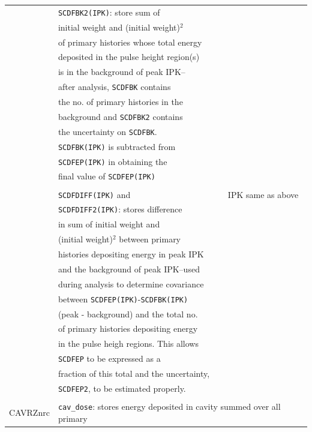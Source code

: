 \documentclass[12pt,twoside]{article}  %
\begin{document}
\begin{longtable}{lll}
          & {\tt SCDFBK2(IPK)}: store sum of&\\
          & initial weight and (initial weight)$^2$ &\\
          & of primary histories whose total energy&\\
          & deposited in the pulse height region(s)&\\
          & is in the background of peak IPK--&\\
          & after analysis, {\tt SCDFBK} contains&\\
          & the no. of primary histories in the&\\
          & background and {\tt SCDFBK2} contains&\\
          & the uncertainty on {\tt SCDFBK}.  &\\
          & {\tt SCDFBK(IPK)} is subtracted from&\\
          & {\tt SCDFEP(IPK)} in obtaining the &\\
          & final value of {\tt SCDFEP(IPK)}&\\
          &&\\
          & {\tt SCDFDIFF(IPK)} and & IPK same as above\\
          & {\tt SCDFDIFF2(IPK)}: stores difference&\\
          & in sum of initial weight and &\\
          & (initial weight)$^2$ between primary&\\
          & histories depositing energy in peak IPK&\\
          & and the background of peak IPK--used&\\
          & during analysis to determine covariance&\\
          & between {\tt SCDFEP(IPK)}-{\tt SCDFBK(IPK)}&\\
          & (peak - background) and the total no.&\\
          & of primary histories depositing energy&\\
          & in the pulse heigh regions.  This allows&\\
          & {\tt SCDFEP} to be expressed as a&\\
          & fraction of this total and the uncertainty,&\\
          & {\tt SCDFEP2}, to be estimated properly.&\\   
          &                                  &\\
CAVRZnrc  & \multicolumn{2}{l}{{\tt cav\_dose}: stores energy deposited in cavity summed over all primary}\\

\end{longtable}
\end{document}
